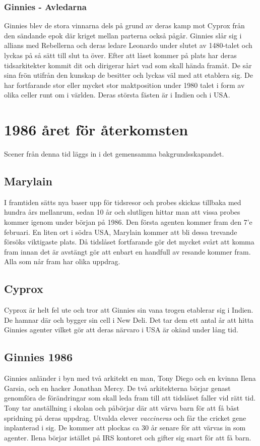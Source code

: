 \documentclass[a5paper,10pt]{report}
\begin{document}
\subsection{Ginnies - Avledarna}
Ginnies blev de stora vinnarna dels på grund av deras kamp mot Cyprox från den sändande epok där kriget mellan parterna också pågår. Ginnies slår sig i allians med Rebellerna och deras ledare Leonardo under slutet av 1480-talet och lyckas på så sätt till slut ta över. Efter att låset kommer på plats har deras tidsarkitekter kommit dit och dirigerar hårt vad som skall hända framåt. De sår sina frön utifrån den kunskap de besitter och lyckas väl med att etablera sig. De har fortfarande stor eller mycket stor maktposition under 1980 talet i form av olika celler runt om i världen. Deras största fästen är i Indien och i USA.
\chapter{1986 året för återkomsten}
Scener från denna tid läggs in i det gemensamma bakgrundsskapandet.
\section{Marylain}
I framtiden sätts nya baser upp för tidsresor och probes skickas tillbaka med hundra års mellanrum, sedan 10 år och slutligen hittar man att vissa probes kommer igenom under början på 1986. Den första agenten kommer fram den 7'e februari. En liten ort i södra USA, Marylain kommer att bli dessa trevande försöks viktigaste plats. Då tidslåset fortfarande gör det mycket svårt att komma fram innan det är avstängt gör att enbart en handfull av resande kommer fram. Alla som når fram har olika uppdrag.
\section{Cyprox}
Cyprox är helt fel ute och tror att Ginnies sin vana trogen etablerar sig i Indien. De hamnar där och bygger sin cell i New Deli. Det tar dem ett antal år att hitta Ginnies agenter vilket gör att deras närvaro i USA är okänd under lång tid.
\section{Ginnies 1986}
Ginnies anländer i byn med två arkitekt en man, Tony Diego och en kvinna Ilena Garsia, och en hacker Jonathan Mercy. De två arkitekterna börjar genast genomföra de förändringar som skall leda fram till att tidslåset faller vid rätt tid. Tony tar anställning i skolan och påbörjar där att värva barn för att få bäst spridning på deras uppdrag. Utvalda elever \textit{vaccineras} och får the cricket gene inplanterad i sig. De kommer att plockas ca 30 år senare för att värvas in som agenter. Ilena börjar istället på IRS kontoret och gifter sig snart för att få barn.
\end{document}
